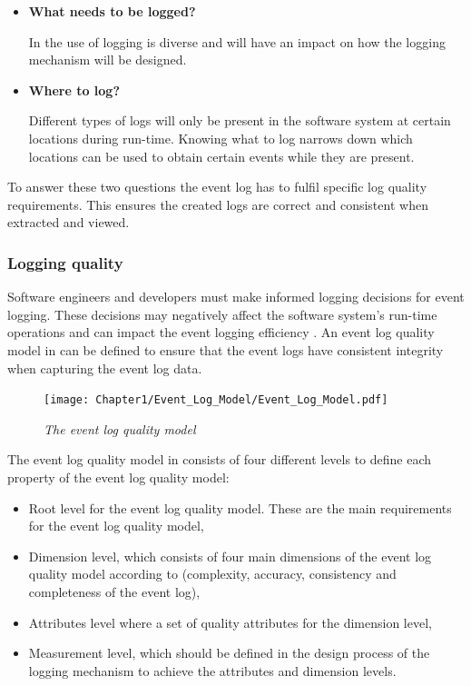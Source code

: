 \begin{itemize}
	\item \textbf{What needs to be logged?}\par In  the use of logging is diverse and will have an impact on how the logging mechanism will be designed.
	\item \textbf{Where to log?} \par Different types of logs will only be present in the software system at certain locations during run-time. Knowing what to log narrows down which locations can be used to obtain certain events while they are present.
\end{itemize}

To answer these two questions the event log has to fulfil specific log quality requirements. This ensures the created logs are correct and consistent when extracted and viewed. 

\clearpage

\subsubsection{Logging quality}\label{sec:ch1_loggingQuality}

Software engineers and developers must make informed logging decisions for event logging. These decisions may negatively affect the software system's run-time operations and can impact the event logging efficiency \cite{Zhu2015, Zhu2019, Kherbouche2017}. An event log quality model in  can be defined to ensure that the event logs have consistent integrity when capturing the event log data.

\begin{figure}[!htb]
	\centering %
	\texttt{[image: Chapter1/Event\_Log\_Model/Event\_Log\_Model.pdf]}
	\caption[The event log quality model]
	{\textit{The event log quality model \cite{Kherbouche2017}}} \label{fig:ch1_EventQModel}
\end{figure}

The event log quality model in  consists of four different levels to define each property of the event log quality model:

\begin{itemize}
	\item Root level for the event log quality model. These are the main requirements for the event log quality model,
	\item Dimension level, which consists of four main dimensions of the event log quality model according to \cite{Kherbouche2017} (complexity, accuracy, consistency and completeness of the event log),
	\item Attributes level where a set of quality attributes for the dimension level,
	\item Measurement level, which should be defined in the design process of the logging mechanism to achieve the attributes and dimension levels.
\end{itemize}

